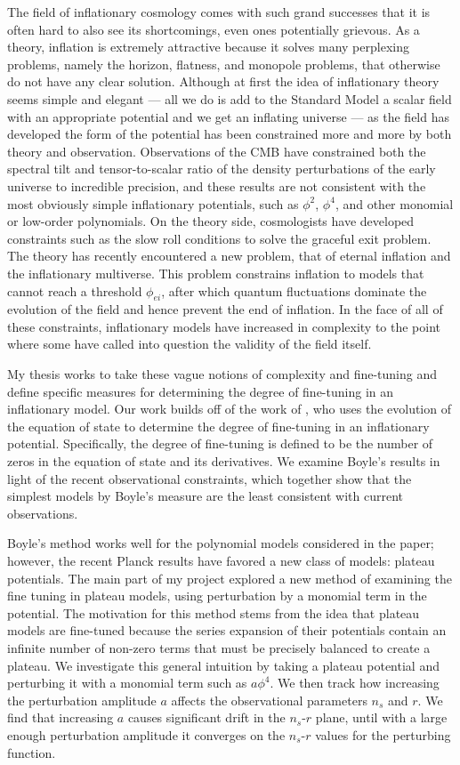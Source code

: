 \documentclass[a4paper,11pt]{article}
\def\nsr{$n_s$-$r$ }
\begin{document}
The field of inflationary cosmology comes with such grand successes that it is often hard to also see its shortcomings, even ones potentially grievous. As a theory, inflation is extremely attractive because it solves many perplexing problems, namely the horizon, flatness, and monopole problems, that otherwise do not have any clear solution. Although at first the idea of inflationary theory seems simple and elegant --- all we do is add to the Standard Model a scalar field with an appropriate potential and we get an inflating universe --- as the field has developed the form of the potential has been constrained more and more by both theory and observation. Observations of the CMB have constrained both the spectral tilt and tensor-to-scalar ratio of the density perturbations of the early universe to incredible precision, and these results are not consistent with the most obviously simple inflationary potentials, such as $\phi^2$, $\phi^4$, and other monomial or low-order polynomials. On the theory side, cosmologists have developed constraints such as the slow roll conditions to solve the graceful exit problem. The theory has recently encountered a new problem, that of eternal inflation and the inflationary multiverse. This problem constrains inflation to models that cannot reach a threshold $\phi_{ei}$, after which quantum fluctuations dominate the evolution of the field and hence prevent the end of inflation. In the face of all of these constraints, inflationary models have increased in complexity to the point where some have called into question the validity of the field itself.

My thesis works to take these vague notions of complexity and fine-tuning and define specific measures for determining the degree of fine-tuning in an inflationary model. Our work builds off of the work of \citet{Boyle+2006}, who uses the evolution of the equation of state to determine the degree of fine-tuning in an inflationary potential. Specifically, the degree of fine-tuning is defined to be the number of zeros in the equation of state and its derivatives. We examine Boyle's results in light of the recent \citet{Planck2015} observational constraints, which together show that the simplest models by Boyle's measure are the least consistent with current observations. 

Boyle's method works well for the polynomial models considered in the paper; however, the recent Planck results have favored a new class of models: plateau potentials. The main part of my project explored a new method of examining the fine tuning in plateau models, using perturbation by a monomial term in the potential. The motivation for this method stems from the idea that plateau models are fine-tuned because the series expansion of their potentials contain an infinite number of non-zero terms that must be precisely balanced to create a plateau. We investigate this general intuition by taking a plateau potential and perturbing it with a monomial term such as $a\phi^4$. We then track how increasing the perturbation amplitude $a$ affects the observational parameters $n_s$ and $r$. We find that increasing $a$ causes significant drift in the \nsr plane, until with a large enough perturbation amplitude it converges on the \nsr values for the perturbing function. 
\end{document}
